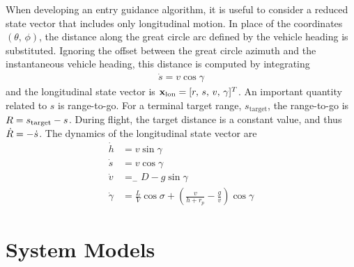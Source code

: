 When developing an entry guidance algorithm, it is useful to consider a reduced state vector that includes only longitudinal motion. In place of the coordinates $(\theta,\,\phi)$, the distance along the great circle arc defined by the vehicle heading is substituted. Ignoring the offset between the great circle azimuth and the instantaneous vehicle heading, this distance is computed by integrating
\begin{align}
	\dot{s} = v\cos\gamma
\end{align}
and the longitudinal state vector is $\mathbf{x}_{\mathrm{lon}} = [r,\,s,\,v,\,\gamma]^T$. An important quantity related to $s$ is range-to-go. For a terminal target range, $s_{\mathrm{target}}$, the range-to-go is $R=s_{\mathrm{target}}-s$. During flight, the target distance is a constant value, and thus $\dot{R}=-\dot{s}$.
The dynamics of the longitudinal state vector are 
\begin{align}
	\dot{h} &= v\sin\gamma \label{Eq:dynamics:altitude:time}\\
	\dot{s} &= v\cos\gamma \\
	\dot{v} &= _-D - g\sin\gamma \label{Eq:dynamics_velocity:time}\\ 
	\dot{\gamma} &= \frac{L}{V}\cos\sigma + \left(\frac{v}{h+r_p}-\frac{g}{v}\right)\cos\gamma \label{Eq:dynamics:fpa:time}
\end{align}

\section{System Models}
